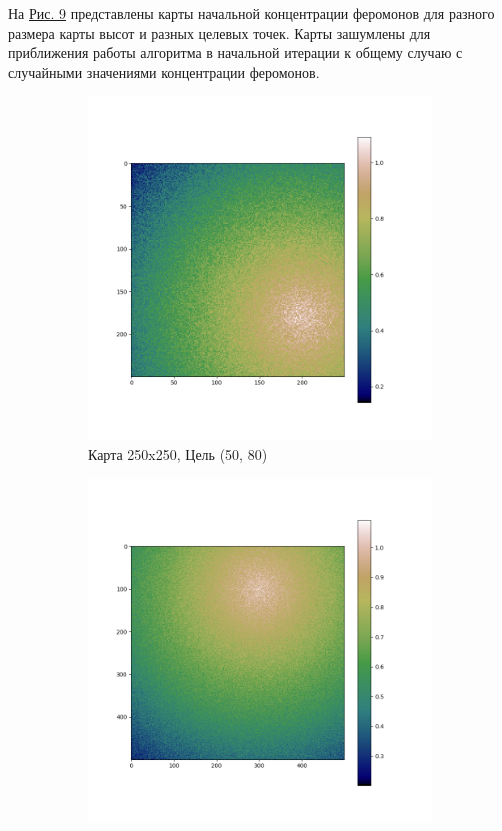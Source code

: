 \documentclass{article}
\numberwithin{equation}{section}
\begin{document}
			На \hyperref[fig:pher]{Рис. 9} представлены карты начальной концентрации феромонов для разного размера карты высот и разных целевых точек. Карты зашумлены для приближения работы алгоритма в начальной итерации к общему случаю с случайными значениями концентрации феромонов.

			\begin{figure}[H]
				\vspace{-0.5cm}
				\centering
				\begin{subfigure}[b]{0.49\textwidth}
					\includegraphics[width=\textwidth]{data/heuristics_example/pheromone_250x250.png}
					\caption*{Карта 250x250, Цель (50, 80)}
				\end{subfigure}
				\begin{subfigure}[b]{0.49\textwidth}
					\includegraphics[width=\textwidth]{data/heuristics_example/pheromone_500x500.png}

\end{subfigure}
\end{figure}
\end{document}
